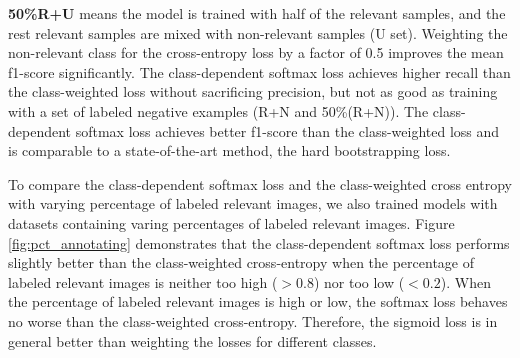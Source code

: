 \begin{table}[t]
{\textbf{50\%R+U} means the model is trained with half of the relevant samples, and the rest relevant samples are mixed with non-relevant samples (U set).
Weighting the non-relevant class for the cross-entropy loss by a factor of 0.5 improves the mean f1-score significantly.
The class-dependent softmax loss achieves higher recall than the class-weighted loss without sacrificing precision, but not as good as training with a set of labeled negative examples (R+N and 50\%(R+N)).
The class-dependent softmax loss achieves better f1-score than the class-weighted loss and is comparable to a state-of-the-art method, the hard bootstrapping loss.
}
\label{tab:cifar}
\end{table}


To compare the class-dependent softmax loss and the class-weighted cross entropy with varying percentage of labeled relevant images, we also trained models with datasets containing varing percentages of labeled relevant images.
Figure \ref{fig:pct_annotating} demonstrates that the class-dependent softmax loss performs slightly better than the class-weighted cross-entropy when the percentage of labeled relevant images is neither too high ($>0.8$) nor too low ($<0.2$).
When the percentage of labeled relevant images is high or low, the softmax loss behaves no worse than the class-weighted cross-entropy.
Therefore, the sigmoid loss is in general better than weighting the losses for different classes.


